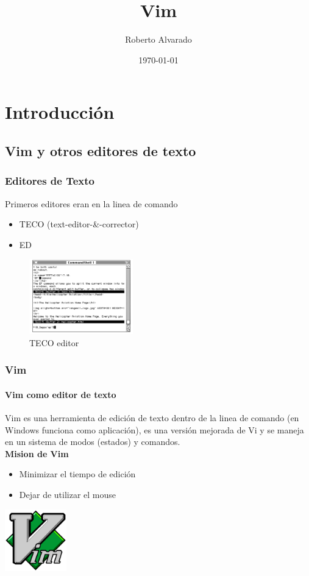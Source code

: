 \documentclass{beamer}
\title{Vim}
\author{Roberto Alvarado}
\institute{USFQ}
\date{\today}
\begin{document}
  \begin{frame}[t]
    \maketitle
  \end{frame}

  \begin{frame}[t]
    \tableofcontents
  \end{frame}

  \section{Introducción}
  \subsection{Vim y otros editores de texto}
  \begin{frame}
    \frametitle{Editores de Texto}
      Primeros editores eran en la linea de comando\\
      \begin{itemize}
        \item TECO (text-editor-\&-corrector) \\
        \item ED
      \end{itemize}
      \begin{figure}[h]
        \centering
        \includegraphics[width=0.4\textwidth]{./resources/1.png}
        \caption{TECO editor}
        \label{fig:1}
      \end{figure}
  \end{frame}

  \begin{frame}[t]
    \frametitle{Vim}
    \framesubtitle{Vim como editor de texto}
    Vim es una herramienta de edición de texto dentro de la linea de comando
    (en Windows funciona como aplicación), es una versión mejorada de Vi y se
    maneja en un sistema de modos (estados) y comandos.\\
    \bf{Mision de Vim}
    \begin{itemize}
      \item Minimizar el tiempo de edición 
      \item Dejar de utilizar el mouse
    \end{itemize}
      \centering
      \includegraphics[width=0.2\textwidth]{./resources/6.png}
  \end{frame}
\end{document}
